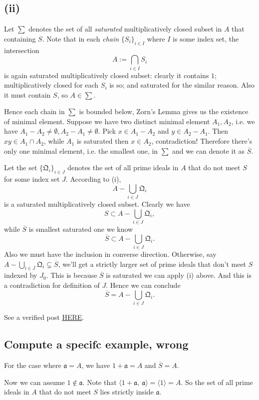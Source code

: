 \subsection{(ii)}

Let $\sum$ denotes the set of all \textit{saturated} multiplicatively closed subset in $A$ that containing $S$. Note that in each \textit{chain} $\{S_i\}_{i\in I}$ where $I$ is some index set, the intersection 
$$A:=\bigcap_{i\in I} S_i$$ is again saturated multiplicatively closed subset: clearly it contains $1$; multiplicatively closed for each $S_i$ is so; and saturated for the similar reason. Also it must contain $S$, so $A\in\sum$.

Hence each chain in $\sum$ is bounded below, Zorn's Lemma gives us the existence of minimal element. 
Suppose we have two distinct minimal element $A_1,A_2$, i.e. we have $A_1-A_2\neq\emptyset,A_2-A_1\neq\emptyset$. Pick $x\in A_1-A_2$ and $y\in A_2-A_1$. Then $xy\in A_1\cap A_2$, while $A_1$ is saturated then $x\in A_2$, contradiction! Therefore there's only one minimal element, i.e. the smallest one, in $\sum$ and we can denote it as $\overline{S}$.

Let the set $\{\mathfrak Q_i\}_{i\in J}$ denotes the set of all prime ideals in $A$ that do not meet $S$ for some index set $J$. According to (i),
$$A-\bigcup_{i\in J}\mathfrak Q_i$$ is a saturated multiplicatively closed subset. 
Clearly we have 
$$S\subset A-\bigcup_{i\in J}\mathfrak Q_i,$$ while $\overline{S}$ is smallest saturated one we know
$$\overline{S} \subset A-\bigcup_{i\in J}\mathfrak Q_i.$$
Also we must have the inclusion in converse direction. Otherwise, say $A-\bigcup_{i\in J}\mathfrak Q_i\subsetneq \overline{S}$, we'll get a strictly larger set of prime ideals that don't meet $S$ indexed by $J_0$. This is because $\overline{S}$ is saturated we can apply (i) above. And this is a contradiction for definition of $J$. Hence we can conclude 
$$\overline{S}= A-\bigcup_{i\in J}\mathfrak Q_i.$$

See a verified post \href{http://www.math.caltech.edu/~2016-17/1term/ma120a/solutions/Sol1.pdf}{HERE}. 

\subsection{Compute a specifc example, wrong}

For the case where $\mathfrak a=A$, we have $1+\mathfrak a=A$ and $\overline{S}=A$.

Now we can assume $1\notin \mathfrak a$.
Note that $\langle 1+\mathfrak a,~ \mathfrak a\rangle=\langle 1\rangle=A$. So the set of all prime ideals in $A$ that do not meet $S$ lies strictly inside $\mathfrak a$. 

